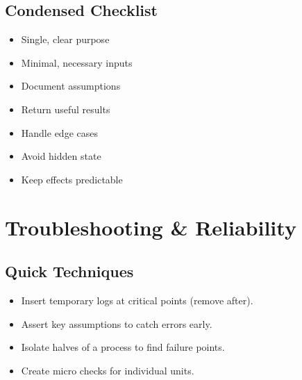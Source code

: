 \documentclass[11pt]{article}
\begin{document}
\subsection*{Condensed Checklist}
\begin{itemize}\itemsep2pt
  \item Single, clear purpose
  \item Minimal, necessary inputs
  \item Document assumptions
  \item Return useful results
  \item Handle edge cases
  \item Avoid hidden state
  \item Keep effects predictable
\end{itemize}

\pagebreak
\section*{\textcolor{gatororange}{Troubleshooting \& Reliability}}

\subsection*{Quick Techniques}
\begin{itemize}\itemsep2pt
  \item Insert temporary logs at critical points (remove after).
  \item Assert key assumptions to catch errors early.
  \item Isolate halves of a process to find failure points.
  \item Create micro checks for individual units.
\end{itemize}
\end{document}
